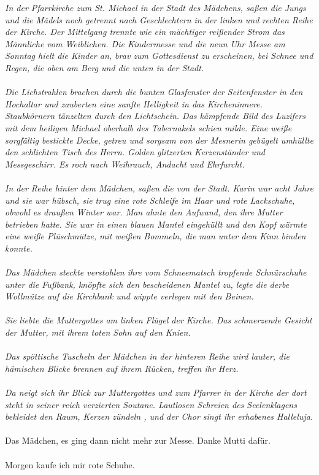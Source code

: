 \textit{In der Pfarrkirche zum St. Michael in der Stadt des Mädchens, saßen die Jungs und die Mädels noch getrennt nach Geschlechtern in der linken und rechten Reihe der Kirche. Der Mittelgang trennte wie ein mächtiger reißender Strom das Männliche vom Weiblichen. Die Kindermesse und die neun Uhr Messe am Sonntag hielt die Kinder an, brav zum Gottesdienst zu erscheinen, bei Schnee und Regen, die oben am Berg und die unten in der Stadt. \\\\
Die Lichstrahlen brachen durch die bunten Glasfenster der Seitenfenster in den Hochaltar und zauberten eine sanfte Helligkeit in das Kircheninnere. Staubkörnern tänzelten durch den Lichtschein. Das kämpfende Bild des Luzifers mit dem heiligen Michael oberhalb des Tabernakels schien milde. Eine weiße sorgfältig bestickte Decke, getreu und sorgsam von der Mesnerin gebügelt umhüllte den schlichten Tisch des Herrn. Golden glitzerten Kerzenständer und Messgeschirr. Es roch nach Weihrauch, Andacht und Ehrfurcht.\\\\
In der Reihe hinter dem Mädchen, saßen die von der Stadt. Karin war acht Jahre und sie war hübsch, sie trug eine rote Schleife im Haar und rote Lackschuhe, obwohl es draußen Winter war. Man ahnte den Aufwand, den ihre Mutter betrieben hatte. Sie war in einen blauen Mantel eingehüllt und den Kopf wärmte eine weiße Plüschmütze, mit weißen Bommeln, die man unter dem Kinn binden konnte. \\\\
Das Mädchen steckte verstohlen ihre vom Schneematsch tropfende Schnürschuhe unter die Fußbank, knöpfte sich den bescheidenen Mantel zu, legte die derbe Wollmütze auf die Kirchbank und wippte verlegen mit den Beinen.\\\\
Sie liebte die Muttergottes am linken Flügel der Kirche. Das schmerzende Gesicht der Mutter, mit ihrem toten Sohn auf den Knien. \\\\
Das spöttische Tuscheln der Mädchen in der hinteren Reihe wird lauter, die hämischen Blicke brennen auf ihrem Rücken, treffen ihr Herz.\\\\
Da neigt sich ihr Blick zur Muttergottes und zum Pfarrer in der Kirche der dort steht in seiner reich verzierten Soutane. Lautlosen Schreien des Seelenklagens bekleidet den Raum, Kerzen zündeln , und der Chor singt ihr erhabenes Halleluja.}
\\\\
Das Mädchen, es ging dann nicht mehr zur Messe. Danke Mutti dafür.
\\\\
Morgen kaufe ich mir rote Schuhe.
